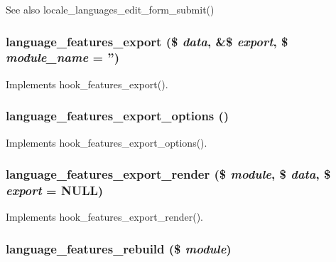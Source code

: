 \begin{DoxySeeAlso}{See also}
locale\_\-languages\_\-edit\_\-form\_\-submit() 
\end{DoxySeeAlso}
\hypertarget{features_8locale_8inc_a9cba8a9e6b287fb52f235b0fa6abfb1a}{
\subsubsection[{language\_\-features\_\-export}]{\setlength{\rightskip}{0pt plus 5cm}language\_\-features\_\-export (\$ {\em data}, \/  \&\$ {\em export}, \/  \$ {\em module\_\-name} = {\ttfamily ''})}}
\label{features_8locale_8inc_a9cba8a9e6b287fb52f235b0fa6abfb1a}
Implements hook\_\-features\_\-export(). \hypertarget{features_8locale_8inc_a1bd90e5855e637efaa9d3ab7efff7ce8}{
\subsubsection[{language\_\-features\_\-export\_\-options}]{\setlength{\rightskip}{0pt plus 5cm}language\_\-features\_\-export\_\-options ()}}
\label{features_8locale_8inc_a1bd90e5855e637efaa9d3ab7efff7ce8}
Implements hook\_\-features\_\-export\_\-options(). \hypertarget{features_8locale_8inc_ac6d5aee947234fef3a30f79700e27389}{
\subsubsection[{language\_\-features\_\-export\_\-render}]{\setlength{\rightskip}{0pt plus 5cm}language\_\-features\_\-export\_\-render (\$ {\em module}, \/  \$ {\em data}, \/  \$ {\em export} = {\ttfamily NULL})}}
\label{features_8locale_8inc_ac6d5aee947234fef3a30f79700e27389}
Implements hook\_\-features\_\-export\_\-render(). \hypertarget{features_8locale_8inc_a16d6aa7d5802ae4863d732698b776e1f}{
\subsubsection[{language\_\-features\_\-rebuild}]{\setlength{\rightskip}{0pt plus 5cm}language\_\-features\_\-rebuild (\$ {\em module})}}
